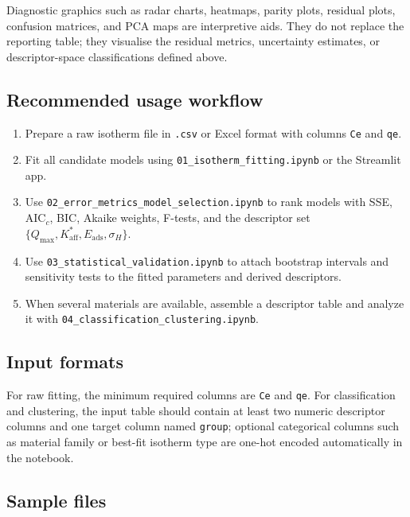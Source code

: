 \documentclass[journal=jacsat,manuscript=article]{achemso}
\begin{document}
Diagnostic graphics such as radar charts, heatmaps, parity plots, residual
plots, confusion matrices, and PCA maps are interpretive aids. They do not
replace the reporting table; they visualise the residual metrics, uncertainty
estimates, or descriptor-space classifications defined above.

\subsection{Recommended usage workflow}
\label{sec:si_notebook_workflow}

\begin{enumerate}
	\item Prepare a raw isotherm file in \texttt{.csv} or Excel format with
	columns \texttt{Ce} and \texttt{qe}.
	\item Fit all candidate models using
	\texttt{01\_isotherm\_fitting.ipynb} or the Streamlit app.
	\item Use \texttt{02\_error\_metrics\_model\_selection.ipynb} to rank models
	with SSE, AIC$_c$, BIC, Akaike weights, F-tests, and the descriptor set
	$\{Q_{\max}, K_{\mathrm{aff}}^{\ast}, E_{\mathrm{ads}}, \sigma_H\}$.
	\item Use \texttt{03\_statistical\_validation.ipynb} to attach bootstrap
	intervals and sensitivity tests to the fitted parameters and derived
	descriptors.
	\item When several materials are available, assemble a descriptor table and
	analyze it with \texttt{04\_classification\_clustering.ipynb}.
\end{enumerate}

\subsection{Input formats}
\label{sec:si_notebook_inputs}

For raw fitting, the minimum required columns are \texttt{Ce} and \texttt{qe}.
For classification and clustering, the input table should contain at least two
numeric descriptor columns and one target column named \texttt{group}; optional
categorical columns such as material family or best-fit isotherm type are
one-hot encoded automatically in the notebook.

\subsection{Sample files}
\label{sec:si_notebook_samples}
\end{document}
